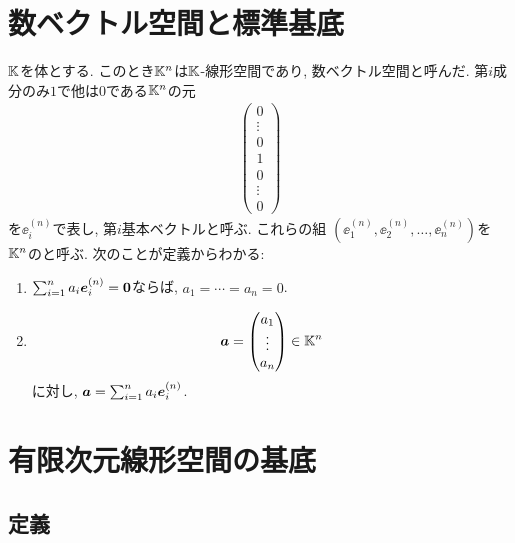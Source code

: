 \section{数ベクトル空間と標準基底}
\label{sec:basis:standard}
$\mathbb{K}$を体とする.
このとき$\mathbb{K}^n$は$\mathbb{K}$-線形空間であり,
数ベクトル空間と呼んだ.
第$i$成分のみ$1$で他は$0$である$\mathbb{K}^n$の元
\begin{align*}
  \begin{pmatrix}0\\\vdots\\0\\1\\0\\\vdots\\0\end{pmatrix}
\end{align*}
を$\ee^{(n)}_i$で表し,
第$i$基本ベクトルと呼ぶ.
これらの組 $(\ee^{(n)}_1,\ee^{(n)}_2,\ldots,\ee^{(n)}_n)$を
$\mathbb{K}^n$のと呼ぶ.
次のことが定義からわかる:
\begin{enumerate}
  \item
    $\sum_{i=1}^na_i\boldsymbol{e}^{(n)}_i=\boldsymbol{0}$ならば, $a_1=\cdots=a_n=0$.
\item
    \begin{align*}
      \boldsymbol{a}=\begin{pmatrix}a_1\\\vdots\\a_n\end{pmatrix}\in\mathbb{K}^n
    \end{align*}
    に対し, $\boldsymbol{a}=\sum_{i=1}^na_i\boldsymbol{e}^{(n)}_i$.
\end{enumerate}


\section{有限次元線形空間の基底}
\label{sec:basis:def}

\subsection{定義}


